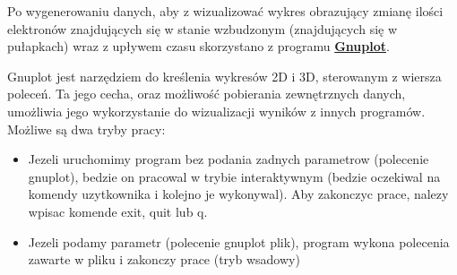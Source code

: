 Po wygenerowaniu danych, aby z wizualizować wykres obrazujący zmianę ilości elektronów znajdujących się w stanie wzbudzonym (znajdujących się w pułapkach) wraz z upływem czasu skorzystano z programu \href{http://www.gnuplot.info/}{\textbf{Gnuplot}}.

Gnuplot jest narzędziem do kreślenia wykresów 2D i 3D, sterowanym z wiersza poleceń. Ta jego cecha, oraz możliwość pobierania zewnętrznych danych, umożliwia jego wykorzystanie do wizualizacji wyników z innych programów. Możliwe są dwa tryby pracy:
\begin{itemize}
\item Jezeli uruchomimy program bez podania zadnych parametrow (polecenie gnuplot), bedzie on pracowal w trybie interaktywnym (bedzie oczekiwal na komendy uzytkownika i kolejno je wykonywal). Aby zakonczyc prace, nalezy wpisac komende exit, quit lub q.
\item Jezeli podamy parametr (polecenie gnuplot plik), program wykona polecenia zawarte w pliku i zakonczy prace (tryb wsadowy)
\end{itemize}
